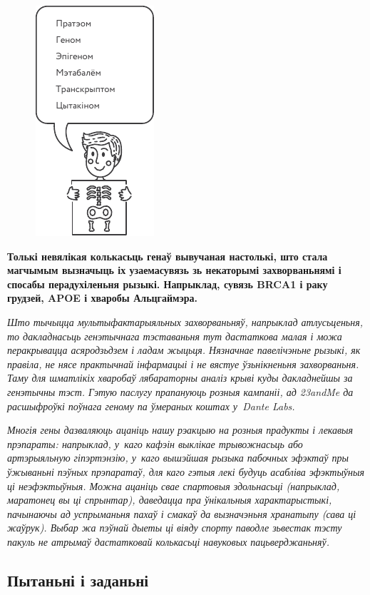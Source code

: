 \begin{figure}[htb!]
  \centering
  \includegraphics[scale=1.5]{willpower/ch3/7.pdf}
\end{figure}

\textbf{Толькі невялікая колькасьць генаў вывучаная настолькі, што стала магчымым вызначыць іх узаемасувязь зь некаторымі захворваньнямі і спосабы перадухіленьня рызыкі. Напрыклад, сувязь BRCA1 і раку грудзей, APOE і хваробы Альцгаймэра.}

\emph{Што тычыцца мультыфактарыяльных захворваньняў, напрыклад атлусьценьня, то дакладнасьць генэтычнага тэставаньня тут дастаткова малая і можа перакрывацца асяродзьдзем і ладам жыцьця. Нязначнае павелічэньне рызыкі, як правіла, не нясе практычнай інфармацыі і не вястуе ўзьнікненьня захворваньня. Таму для шматлікіх хваробаў лябараторны аналіз крыві куды дакладнейшы за генэтычны тэст. Гэтую паслугу прапануюць розныя кампаніі, ад 23andMe да расшыфроўкі поўнага геному па ўмераных коштах у~Dante Labs.}

\emph{Многія гены дазваляюць ацаніць нашу рэакцыю на розныя прадукты і лекавыя прэпараты: напрыклад, у~каго кафэін выклікае трывожнасьць або артэрыяльную гіпэртэнзію, у~каго вышэйшая рызыка пабочных эфэктаў пры ўжываньні пэўных прэпаратаў, для каго гэтыя лекі будуць асабліва эфэктыўныя ці неэфэктыўныя. Можна ацаніць свае спартовыя здольнасьці (напрыклад, маратонец вы ці спрынтар), даведацца пра ўнікальныя характарыстыкі, пачынаючы ад успрыманьня пахаў і смакаў да вызначэньня хранатыпу (сава ці жаўрук). Выбар жа пэўнай дыеты ці віяду спорту паводле зьвестак тэсту пакуль не атрымаў дастатковай колькасьці навуковых пацьверджаньняў.}

\subsection*{Пытаньні і заданьні}

